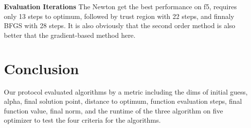 \documentclass[12pt]{article}
\begin{document}
\textbf{Evaluation Iterations}  
The Newton get the best performance on f5, requires only 13 steps to optimum, followed by trust region with 22 steps, and finnaly BFGS with 28 steps. It is also obviously that the second order method is also better that the gradient-based method here.

\begin{table}[h]
    \centering
    \caption{Optimization results for the Log-Ellipsoid Function.}
    \label{tab:f5}
\end{table}




\section{Conclusion}

Our protocol evaluated algorithms by a metric including the dims of initial guess, alpha, final solution point, distance to optimum, function evaluation steps, final function value, final norm, and the runtime of the three algorithm on five optimizer to test the four criteria for the algorithms. 
\end{document}
